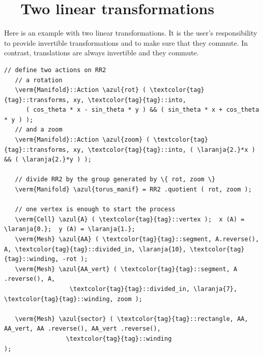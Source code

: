\section{~~Two linear transformations}\label{\numb section 7.\numb parag 18}

Here is an example with two linear transformations.
It is the user's responsibility to provide invertible transformations and
to make sure that they commute.
In contrast, translations are always invertible and they commute.

\begin{Verbatim}[commandchars=\\\{\},formatcom=\small\tt,frame=single,
   label=parag-\ref{\numb section 7.\numb parag 18}.cpp,rulecolor=\color{moldura},
   baselinestretch=0.94,framesep=2mm                                             ]
   // define two actions on RR2
   // a rotation
   \verm{Manifold}::Action \azul{rot} ( \textcolor{tag}{tag}::transforms, xy, \textcolor{tag}{tag}::into,
      ( cos_theta * x - sin_theta * y ) && ( sin_theta * x + cos_theta * y ) );
   // and a zoom
   \verm{Manifold}::Action \azul{zoom} ( \textcolor{tag}{tag}::transforms, xy, \textcolor{tag}{tag}::into, ( \laranja{2.}*x ) && ( \laranja{2.}*y ) );

   // divide RR2 by the group generated by \{ rot, zoom \}
   \verm{Manifold} \azul{torus_manif} = RR2 .quotient ( rot, zoom );

   // one vertex is enough to start the process
   \verm{Cell} \azul{A} ( \textcolor{tag}{tag}::vertex );  x (A) = \laranja{0.};  y (A) = \laranja{1.};
   \verm{Mesh} \azul{AA} ( \textcolor{tag}{tag}::segment, A.reverse(), A, \textcolor{tag}{tag}::divided_in, \laranja{10}, \textcolor{tag}{tag}::winding, -rot );
   \verm{Mesh} \azul{AA_vert} ( \textcolor{tag}{tag}::segment, A .reverse(), A,
                  \textcolor{tag}{tag}::divided_in, \laranja{7}, \textcolor{tag}{tag}::winding, zoom );

   \verm{Mesh} \azul{sector} ( \textcolor{tag}{tag}::rectangle, AA, AA_vert, AA .reverse(), AA_vert .reverse(),
                 \textcolor{tag}{tag}::winding                                                   );
\end{Verbatim}
  
